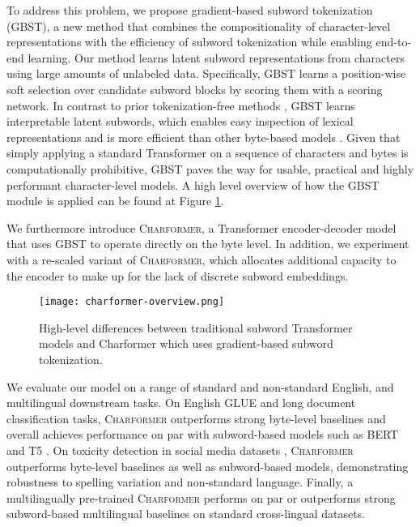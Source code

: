 \documentclass{article} \usepackage{iclr2022_conference,times}
\newcommand{\charformer}{\textsc{Charformer}\xspace}
\begin{document}
\begin{minipage}{0.51\linewidth}
To address this problem, we propose gradient-based subword tokenization (GBST), a new method that combines the compositionality of character-level representations with the efficiency of subword tokenization while enabling end-to-end learning. Our method learns latent subword representations from characters using large amounts of unlabeled data. Specifically, GBST learns a position-wise soft selection over candidate subword blocks by scoring them with a scoring network. In contrast to prior tokenization-free methods \citep{clark2021canine}, GBST learns interpretable latent subwords, which enables easy inspection of lexical representations and is more efficient than other byte-based models \citep{Xue2021byt5}. Given that simply applying a standard Transformer on a sequence of characters and bytes is computationally prohibitive, GBST paves the way for usable, practical and highly performant character-level models. A high level overview of how the GBST module is applied can be found at Figure \ref{overview}. \newline

We furthermore introduce \charformer, a Transformer encoder-decoder model that uses GBST to operate directly on the byte level. In addition, we experiment with a re-scaled variant of \charformer, which allocates additional capacity to the encoder to make up for the lack of discrete subword embeddings.
\end{minipage}
\hspace{0.04\linewidth}
\begin{minipage}{0.45\linewidth}
\begin{figure}[H]
  \vspace{-2em}
  \centering
  \texttt{[image: charformer-overview.png]}
  \caption{High-level differences between traditional subword Transformer models and Charformer which uses gradient-based subword tokenization.} 
  \label{overview}
\end{figure}
\end{minipage}


We evaluate our model on a range of standard and non-standard English, and multilingual downstream tasks. On English GLUE and long document classification tasks, \charformer outperforms strong byte-level baselines and overall achieves performance on par with subword-based models such as BERT \citep{Devlin2019bert} and T5 \citep{Raffel2020t5}. On toxicity detection in social media datasets \citep{DBLP:journals/corr/abs-1903-04561,10.1145/3038912.3052591}, \charformer outperforms byte-level baselines as well as subword-based models, demonstrating robustness to spelling variation and non-standard language. Finally, a multilingually pre-trained \charformer performs on par or outperforms strong subword-based multilingual baselines on standard cross-lingual datasets.
\end{document}
